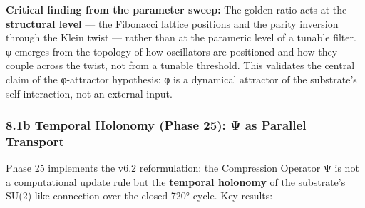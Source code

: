 \documentclass[
]{article}
\begin{document}
\textbf{Critical finding from the parameter sweep:} The golden ratio
acts at the \textbf{structural level} --- the Fibonacci lattice
positions and the parity inversion through the Klein twist --- rather
than at the parameric level of a tunable filter. φ emerges from the
topology of how oscillators are positioned and how they couple across
the twist, not from a tunable threshold. This validates the central
claim of the φ-attractor hypothesis: φ is a dynamical attractor of the
substrate's self-interaction, not an external input.

\subsubsection{8.1b Temporal Holonomy (Phase 25): Ψ as Parallel
Transport}\label{b-temporal-holonomy-phase-25-ux3c8-as-parallel-transport}

Phase 25 implements the v6.2 reformulation: the Compression Operator Ψ
is not a computational update rule but the \textbf{temporal holonomy} of
the substrate's SU(2)-like connection over the closed 720° cycle. Key
results:
\end{document}
